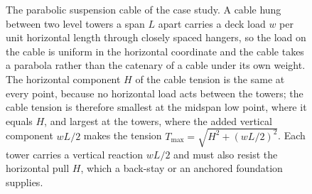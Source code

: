 \begin{figure}[htbp]
\caption[Parabolic suspension cable under deck load]{The parabolic
suspension cable of the case study. A cable hung between two level towers
a span $L$ apart carries a deck load $w$ per unit horizontal length through
closely spaced hangers, so the load on the cable is uniform in the
horizontal coordinate and the cable takes a parabola rather than the
catenary of a cable under its own weight. The horizontal component $H$ of
the cable tension is the same at every point, because no horizontal load
acts between the towers; the cable tension is therefore smallest at the
midspan low point, where it equals $H$, and largest at the towers, where
the added vertical component $wL/2$ makes the tension $T_{\max}=\sqrt{H^2 +
(wL/2)^2}$. Each tower carries a vertical reaction $wL/2$ and must also
resist the horizontal pull $H$, which a back-stay or an anchored foundation
supplies.}
\label{fig:vol03ch02:parabolic-cable}
\end{figure}
